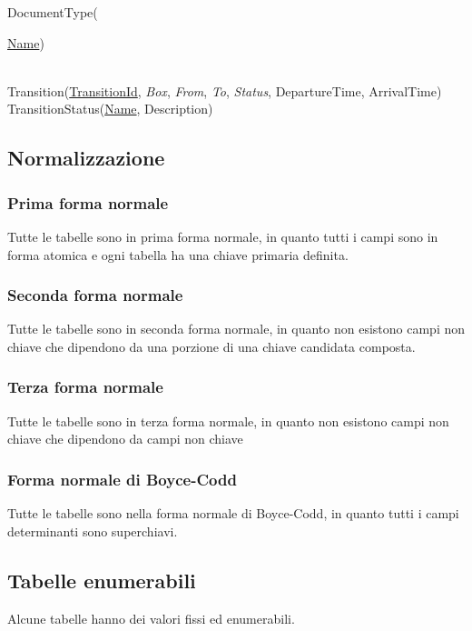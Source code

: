 DocumentType({\underline{Name})

\noindent \\
Transition(\underline{TransitionId}, \textit{Box}, \textit{From}, \textit{To}, \textit{Status}, DepartureTime, ArrivalTime) \\
TransitionStatus(\underline{Name}, Description)

\subsection{Normalizzazione}

\subsubsection{Prima forma normale}

Tutte le tabelle sono in prima forma normale, in quanto tutti i campi sono in forma atomica e ogni tabella ha una chiave primaria definita.

\subsubsection{Seconda forma normale}

Tutte le tabelle sono in seconda forma normale, in quanto non esistono campi non chiave che dipendono da una porzione di una chiave candidata composta.

\subsubsection{Terza forma normale}

Tutte le tabelle sono in terza forma normale, in quanto non esistono campi non chiave che dipendono da campi non chiave

\subsubsection{Forma normale di Boyce-Codd}

Tutte le tabelle sono nella forma normale di Boyce-Codd, in quanto tutti i campi determinanti sono superchiavi.

\subsection{Tabelle enumerabili}

Alcune tabelle hanno dei valori fissi ed enumerabili.

}
